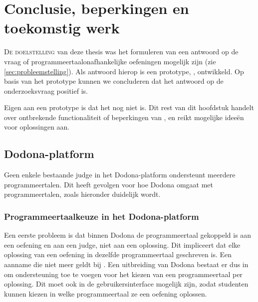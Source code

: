 \chapter{Conclusie, beperkingen en toekomstig werk}\label{ch:beperkingen-en-toekomstig-werk}

\lettrine{D}{e doelstelling} van deze thesis was het formuleren van een antwoord op de vraag of programmeertaalonafhankelijke oefeningen mogelijk zijn (zie \cref{sec:probleemstelling}).
Als antwoord hierop is een prototype, \tested{}, ontwikkeld.
Op basis van het prototype kunnen we concluderen dat het antwoord op de onderzoeksvraag positief is.

Eigen aan een prototype is dat het nog niet  is.
Dit rest van dit hoofdstuk handelt over ontbrekende functionaliteit of beperkingen van \tested{}, en reikt mogelijke ideeën voor oplossingen aan.

\section{Dodona-platform}\label{sec:dodona-platform}

Geen enkele bestaande judge in het Dodona-platform ondersteunt meerdere programmeertalen.
Dit heeft gevolgen voor hoe Dodona omgaat met programmeertalen, zoals hieronder duidelijk wordt.

\subsection{Programmeertaalkeuze in het Dodona-platform}\label{subsec:programmeertaalkeuze-in-het-dodona-platform}

Een eerste probleem is dat binnen Dodona de programmeertaal gekoppeld is aan een oefening en aan een judge, niet aan een oplossing.
Dit impliceert dat elke oplossing van een oefening in dezelfde programmeertaal geschreven is.
Een aanname die niet meer geldt bij \tested{}.
Een uitbreiding van Dodona bestaat er dus in om ondersteuning toe te voegen voor het kiezen van een programmeertaal per oplossing.
Dit moet ook in de gebruikersinterface mogelijk zijn, zodat studenten kunnen kiezen in welke programmeertaal ze een oefening oplossen.

